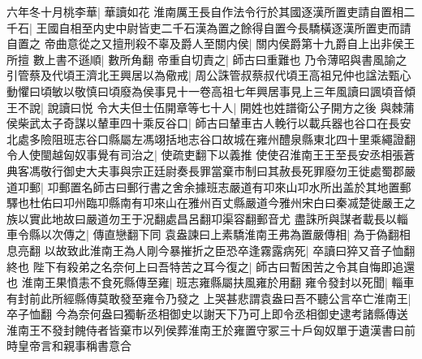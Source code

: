 六年冬十月桃李華|{
	華讀如花}
淮南厲王長自作法令行於其國逐漢所置吏請自置相二千石|{
	王國自相至内史中尉皆吏二千石漢為置之餘得自置今長驕橫逐漢所置吏而請自置之}
帝曲意從之又擅刑殺不辜及爵人至關内侯|{
	關内侯爵第十九爵自上出非侯王所擅}
數上書不遜順|{
	數所角翻}
帝重自切責之|{
	師古曰重難也}
乃令薄昭與書風諭之引管蔡及代頃王濟北王興居以為儆戒|{
	周公誅管叔蔡叔代頃王高祖兄仲也諡法甄心動懼曰頃敏以敬慎曰頃廢為侯事見十一卷高祖七年興居事見上三年風讀曰諷頃音傾}
王不說|{
	說讀曰悦}
令大夫但士伍開章等七十人|{
	開姓也姓譜衛公子開方之後}
與棘蒲侯柴武太子奇謀以輦車四十乘反谷口|{
	師古曰輦車古人輓行以載兵器也谷口在長安北處多險阻班志谷口縣屬左馮翊括地志谷口故城在雍州醴泉縣東北四十里乘繩證翻}
令人使閩越匈奴事覺有司治之|{
	使疏吏翻下以義推}
使使召淮南王王至長安丞相張蒼典客馮敬行御史大夫事與宗正廷尉奏長罪當棄市制曰其赦長死罪廢勿王徙處蜀郡嚴道卭郵|{
	卭郵置名師古曰郵行書之舍余據班志嚴道有卭來山卭水所出盖於其地置郵驛也杜佑曰卭州臨卭縣南有卭來山在雅州百丈縣嚴道今雅州宋白曰秦㓕楚徙嚴王之族以實此地故曰嚴道勿王于况翻處昌呂翻卭渠容翻郵音尤}
盡誅所與謀者載長以輜車令縣以次傳之|{
	傳直戀翻下同}
袁盎諫曰上素驕淮南王弗為置嚴傳相|{
	為于偽翻相息亮翻}
以故致此淮南王為人剛今暴摧折之臣恐卒逢霧露病死|{
	卒讀曰猝又音子恤翻終也}
陛下有殺弟之名奈何上曰吾特苦之耳今復之|{
	師古曰暫困苦之令其自悔即追還也}
淮南王果憤恚不食死縣傳至雍|{
	班志雍縣屬扶風雍於用翻}
雍令發封以死聞|{
	輜車有封前此所經縣傳莫敢發至雍令乃發之}
上哭甚悲謂袁盎曰吾不聽公言卒亡淮南王|{
	卒子恤翻}
今為奈何盎曰獨斬丞相御史以謝天下乃可上即令丞相御史逮考諸縣傳送淮南王不發封餽侍者皆棄市以列侯葬淮南王於雍置守冢三十戶匈奴單于遺漢書曰前時皇帝言和親事稱書意合

